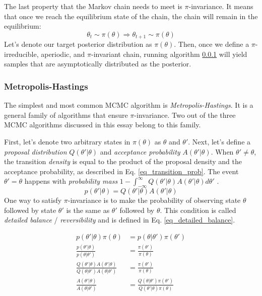 \documentclass[12pt]{article}
\begin{document}
The last property that the Markov chain needs to meet is $\pi$-invariance. It means that once we reach the equilibrium state of the chain, the chain will remain in the equilibrium:
$$
\theta_t \sim \pi(\theta) \Rightarrow \theta_{t+1} \sim \pi(\theta)
$$
Let's denote our target posterior distribution as $\pi(\theta)$. Then, once we define a $\pi$-irreducible, aperiodic, and $\pi$-invariant chain, running algorithm \ref{} will yield samples that are asymptotically distributed as the posterior.

\subsubsection{Metropolis-Hastings}

The simplest and most common MCMC algorithm is \textit{Metropolis-Hastings}. It is a general family of algorithms that ensure $\pi$-invariance. Two out of the three MCMC algorithms discussed in this essay belong to this family.

First, let's denote two arbitrary states in $\pi(\theta)$ as $\theta$ and $\theta'$. Next, let's define a \textit{proposal distribution} $Q(\theta'|\theta)$ and \textit{acceptance probability} $A(\theta'|\theta)$. When $\theta' \ne \theta$, the transition \textit{density} is equal to the product of the proposal density and the acceptance probability, as described in Eq. \ref{eq_transition_prob}. The event $\theta' = \theta$ happens with \textit{probability mass} $1-\int_{-\infty}^{\infty} Q(\theta'|\theta)A(\theta'|\theta) d\theta'$ .
$$
p(\theta'|\theta) = Q(\theta'|\theta)A(\theta'|\theta)
\label{eq_transition_prob}
$$
One way to satisfy $\pi$-invariance is to make the probability of observing state $\theta$ followed by state $\theta'$ is the same as $\theta'$ followed by $\theta$. This condition is called \textit{detailed balance} / \textit{reversibility} and is defined in Eq. \ref{eq_detailed_balance}.

\begin{align}
p(\theta'|\theta)\pi(\theta) &= p(\theta|\theta')\pi(\theta') \\
\frac{p(\theta'|\theta)}{p(\theta|\theta')} &= \frac{\pi(\theta')}{\pi(\theta)} \\
\frac{Q(\theta'|\theta)A(\theta'|\theta)}{Q(\theta|\theta')A(\theta|\theta')} &= \frac{\pi(\theta')}{\pi(\theta)} \\
\frac{A(\theta'|\theta)}{A(\theta|\theta')} &= \frac{Q(\theta|\theta')\pi(\theta')}{Q(\theta'|\theta)\pi(\theta)} \\
\end{align}
\end{document}
